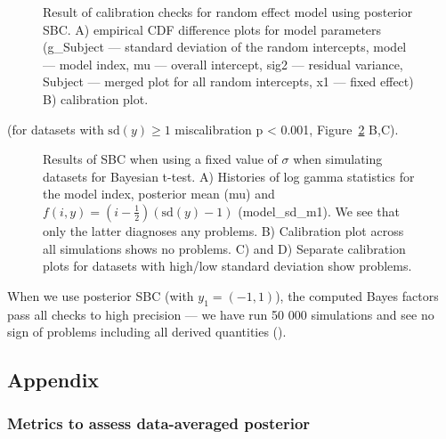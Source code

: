 \documentclass[
  letterpaper,
  DIV=11,
  numbers=noendperiod]{scrartcl}
\begin{document}
\begin{figure}


\caption{\label{fig-ranef-post}Result of calibration checks for random
effect model using posterior SBC. A) empirical CDF difference plots for
model parameters (g\_Subject --- standard deviation of the random
intercepts, model --- model index, mu --- overall intercept, sig2 ---
residual variance, Subject --- merged plot for all random intercepts, x1
--- fixed effect) B) calibration plot.}

\end{figure}%

(for datasets with \(\text{sd}(y) \geq 1\) miscalibration p \textless{}
0.001, Figure~\ref{fig-ttest-fixed} B,C).

\begin{figure}


\caption{\label{fig-ttest-fixed}Results of SBC when using a fixed value
of \(\sigma\) when simulating datasets for Bayesian t-test. A) Histories
of log gamma statistics for the model index, posterior mean (mu) and
\(f(i, y) = (i - \frac{1}{2})(\text{sd}(y) - 1)\) (model\_sd\_m1). We
see that only the latter diagnoses any problems. B) Calibration plot
across all simulations shows no problems. C) and D) Separate calibration
plots for datasets with high/low standard deviation show problems.}

\end{figure}%

When we use posterior SBC (with \(y_1 = (-1,1)\)), the computed Bayes
factors pass all checks to high precision --- we have run 50 000
simulations and see no sign of problems including all derived quantities
().

\subsection{Appendix}\label{appendix}

\subsubsection{Metrics to assess data-averaged
posterior}\label{metrics-to-assess-data-averaged-posterior}
\end{document}
